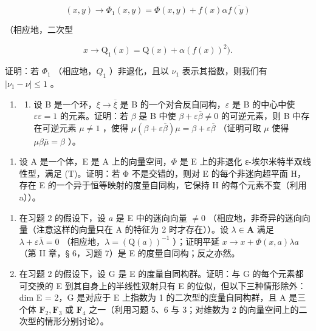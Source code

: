 \[
(x, y) \rightarrow \Phi_ {1} (x, y) = \Phi (x, y) + f (x) \alpha \overline {{f (y)}}
\]

（相应地，二次型

\[
x \rightarrow \mathrm{Q} _ {1} (x) = \mathrm{Q} (x) + \alpha (f (x)) ^ {2}).
\]

证明：若 \(\Phi_{1}\) （相应地，\(Q_{1}\) ）非退化，且以 \(\nu_{1}\) 表示其指数，则我们有 \(|\nu_{1} - \nu| \leqslant 1\) 。

\begin{enumerate}
\def\labelenumi{\arabic{enumi})}
\setcounter{enumi}{4}
\tightlist
\item
  \begin{enumerate}
  \def\labelenumii{\alph{enumii})}
  \tightlist
  \item
    设 B 是一个环，\(\xi \to \overline{\xi}\) 是 B 的一个对合反自同构，\(\varepsilon\) 是 B 的中心中使 \(\varepsilon \varepsilon = 1\) 的元素。证明：若 \(\beta\) 是 B 中使 \(\beta + \varepsilon \overline{\beta} \neq 0\) 的可逆元素，则 B 中存在可逆元素 \(\mu \neq 1\) ，使得 \(\mu (\beta + \varepsilon \overline{\beta}) \mu = \beta + \varepsilon \overline{\beta}\) （证明可取 \(\mu\) 使得 \(\mu \beta \overline{\mu} = \beta\) ）。
  \end{enumerate}
\end{enumerate}

\begin{enumerate}
\def\labelenumi{\alph{enumi})}
\setcounter{enumi}{1}
\tightlist
\item
  设 A 是一个体，E 是 A 上的向量空间，\(\Phi\) 是 E 上的非退化 ε-埃尔米特半双线性型，满足 (T)。证明：若 Φ 不是交错的，则对 E 的每个非迷向超平面 H，存在 E 的一个异于恒等映射的度量自同构，它保持 H 的每个元素不变（利用 a））。
\end{enumerate}

\begin{enumerate}
\def\labelenumi{\arabic{enumi})}
\setcounter{enumi}{5}
\item
  在习题 2 的假设下，设 \(a\) 是 E 中的迷向向量 \(\neq 0\) （相应地，非奇异的迷向向量（注意这样的向量只在 A 的特征为 2 时才存在））。设 \(\lambda \in \mathbf{A}\) 满足 \(\lambda + \varepsilon \bar{\lambda} = 0\) （相应地，\(\lambda = (\mathrm{Q}(a))^{-1}\) ）；证明平延 \(x \to x + \Phi(x, a) \lambda a\) （第 II 章，§ 6，习题 7）是 E 的度量自同构；反之亦然。
\item
  在习题 2 的假设下，设 G 是 E 的度量自同构群。证明：与 G 的每个元素都可交换的 E 到其自身上的半线性双射只有 E 的位似，但以下三种情形除外：dim E = 2，G 是对应于 E 上指数为 1 的二次型的度量自同构群，且 A 是三个体 \(\mathbf{F}_{2}, \mathbf{F}_{3}\) 或 \(\mathbf{F}_{4}\) 之一（利用习题 5、6 与 3；对维数为 2 的向量空间上的二次型的情形分别讨论）。
\end{enumerate}

